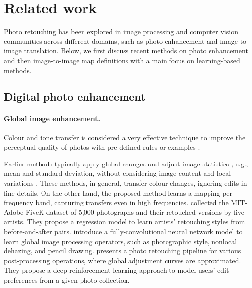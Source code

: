 \section{Related work}

Photo retouching has been explored in image processing and computer vision communities across different domains, such as photo enhancement and image-to-image translation. Below, we first discuss recent methods on photo enhancement and then image-to-image map definitions with a main focus on learning-based methods.

\subsection{Digital photo enhancement}
\paragraph{Global image enhancement.} Colour and tone transfer is considered a very effective technique to improve the perceptual quality of photos with pre-defined rules or examples \cite{Faridul14ASurvey, mustafa2022distilling}.

Earlier methods typically apply global changes and adjust image statistics \cite{Bychkovsky11Learning, Bae06Two, Pitie05NDimensional, Pitie07Automated, Reinhard01Color, Sunkavalli10Multi, he2020conditional, park2018distort}, e.g., mean and standard deviation, without considering image content and local variations \cite{CohenOr06Color}. These methods, in general, transfer colour changes, ignoring edits in fine details. On the other hand, the proposed method learns a mapping per frequency band, capturing transfers even in high frequencies. \citeauthor{Bychkovsky11Learning} \cite{Bychkovsky11Learning} collected the MIT-Adobe FiveK dataset of 5,000 photographs and their retouched versions by five artists. They propose a regression model to learn artists' retouching styles from before-and-after pairs. \citeauthor{chen2017fast} \cite{chen2017fast} introduce a fully-convolutional neural network model to learn global image processing operators, such as photographic style, nonlocal dehazing, and pencil drawing. \citeauthor{Hu18Exposure} \cite{Hu18Exposure} presents a photo retouching pipeline for various post-processing operations, where global adjustment curves are approximated. They propose a deep reinforcement learning approach to model users' edit preferences from a given photo collection.
 
